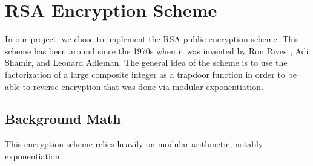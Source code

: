 \section{RSA Encryption Scheme}\label{sec:rsa}

	In our project, we chose to implement the RSA public encryption scheme. This scheme has been around since the 1970s when it was invented by Ron Rivest, Adi Shamir, and Leonard Adleman.
	The general idea of the scheme is to use the factorization of a large composite integer as a trapdoor function in order to be able to reverse encryption that was done via modular
	exponentiation.

	\subsection{Background Math}\label{sec:rsa-background}
		This encryption scheme relies heavily on modular arithmetic, notably exponentiation.
